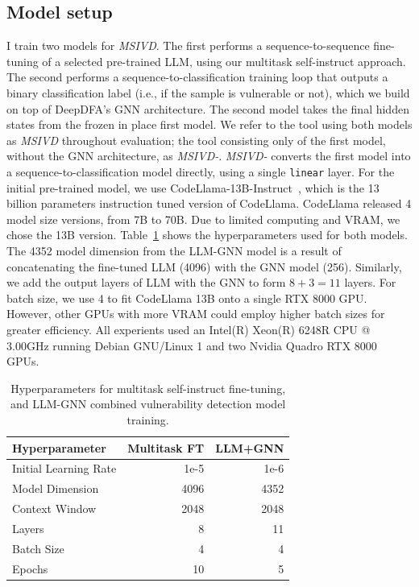 \documentclass[12pt,openany,oneside,table]{cmuthesis}
\begin{document}
\subsection{Model setup}
I  train two models for \textit{MSIVD}. The first performs a sequence-to-sequence fine-tuning of a selected pre-trained LLM, using our multitask self-instruct approach. The second performs a sequence-to-classification training loop that outputs a binary classification label (i.e., if the sample is vulnerable or not), which we build on top of DeepDFA's GNN architecture.
The second model takes the final hidden states from the frozen in place first model. We refer to the tool using both models as \textit{MSIVD} throughout evaluation; the tool consisting only of the first model, without the GNN architecture, as \textit{MSIVD-}.  \textit{MSIVD-} converts the first model into a sequence-to-classification model directly, using a single \lstinline{linear} layer.
For the initial pre-trained model, we use CodeLlama-13B-Instruct~\cite{codellama}, which is the 13 billion parameters instruction tuned version of CodeLlama. CodeLlama released 4 model size versions, from 7B to 70B. Due to limited computing and VRAM, we chose the 13B version. 
Table~\ref{table:hyperparams_vuln} shows the hyperparameters used for both models. The 4352 model dimension from the LLM-GNN model is a result of concatenating the fine-tuned LLM (4096) with the GNN model (256). Similarly, we add the output layers of LLM with the GNN to form $8 + 3 = 11$ layers.
For batch size, we use 4 to fit CodeLlama 13B onto a single RTX 8000 GPU. However, other GPUs with more VRAM could employ higher batch sizes for greater efficiency. All experients used an Intel(R) Xeon(R) 6248R CPU @ 3.00GHz running Debian GNU/Linux 1 and two Nvidia Quadro RTX 8000 GPUs.




\begin{table}[t]
\centering
\caption{\small Hyperparameters for multitask self-instruct fine-tuning, and LLM-GNN combined vulnerability detection model training.
}
\begin{tabular}{l|rr}
\toprule
\textbf{Hyperparameter} & Multitask FT & LLM+GNN \\
\midrule
Initial Learning Rate  &  1e-5 &  1e-6\\
Model Dimension & 4096 & 4352\\
Context Window & 2048 & 2048 \\
Layers  &  8 & 11\\
Batch Size & 4 & 4 \\
Epochs & 10 & 5 \\
\bottomrule
\end{tabular}
\label{table:hyperparams_vuln}
\end{table}
\end{document}

